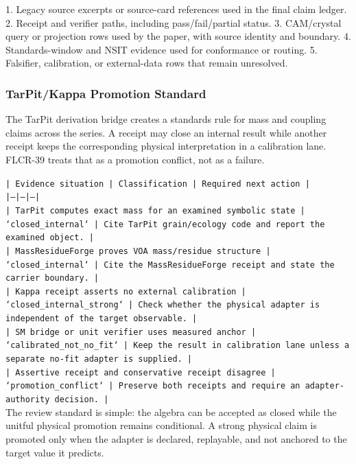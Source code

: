 \documentclass[11pt]{article}
\begin{document}
1. Legacy source excerpts or source-card references used in the final claim ledger.
2. Receipt and verifier paths, including pass/fail/partial status.
3. CAM/crystal query or projection rows used by the paper, with source identity and boundary.
4. Standards-window and NSIT evidence used for conformance or routing.
5. Falsifier, calibration, or external-data rows that remain unresolved.

\subsubsection*{TarPit/Kappa Promotion Standard}

The TarPit derivation bridge creates a standards rule for mass and coupling claims across the series. A receipt may close an internal result while another receipt keeps the corresponding physical interpretation in a calibration lane. FLCR-39 treats that as a promotion conflict, not as a failure.

\noindent\texttt{| Evidence situation | Classification | Required next action |}\\
\noindent\texttt{|---|---|---|}\\
\noindent\texttt{| TarPit computes exact mass for an examined symbolic state | `closed\_internal` | Cite TarPit grain/ecology code and report the examined object. |}\\
\noindent\texttt{| MassResidueForge proves VOA mass/residue structure | `closed\_internal` | Cite the MassResidueForge receipt and state the carrier boundary. |}\\
\noindent\texttt{| Kappa receipt asserts no external calibration | `closed\_internal\_strong` | Check whether the physical adapter is independent of the target observable. |}\\
\noindent\texttt{| SM bridge or unit verifier uses measured anchor | `calibrated\_not\_no\_fit` | Keep the result in calibration lane unless a separate no-fit adapter is supplied. |}\\
\noindent\texttt{| Assertive receipt and conservative receipt disagree | `promotion\_conflict` | Preserve both receipts and require an adapter-authority decision. |}\\

The review standard is simple: the algebra can be accepted as closed while the unitful physical promotion remains conditional. A strong physical claim is promoted only when the adapter is declared, replayable, and not anchored to the target value it predicts.
\end{document}
